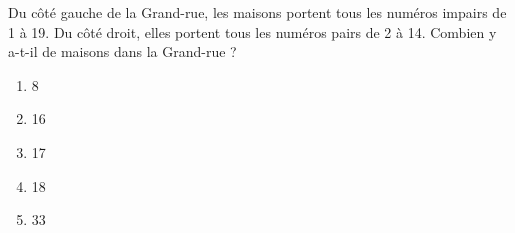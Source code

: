 Du côté gauche de la Grand-rue, les maisons portent tous les numéros
impairs de 1 à 19.  Du côté droit, elles portent tous les numéros
pairs de 2 à 14. Combien y a-t-il de maisons dans la Grand-rue ?
\begin{multicols}{5}
  \begin{enumerate}[A/]
  \item 8
  \item 16
  \item 17
  \item 18
  \item 33
  \end{enumerate}
\end{multicols}